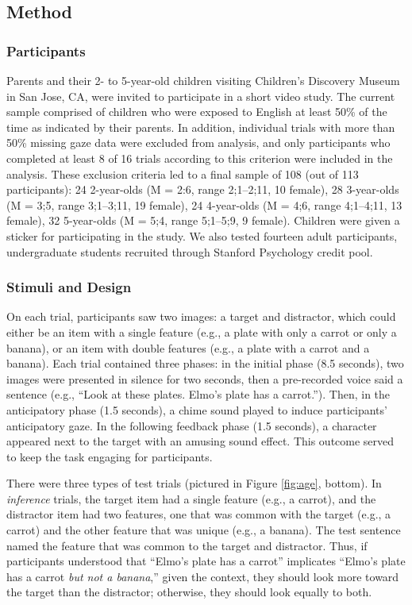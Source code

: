 \documentclass[10pt,letterpaper]{article}
\begin{document}
\subsection{Method}

\subsubsection{Participants}

Parents and their 2- to 5-year-old children visiting Children's Discovery Museum in San Jose, CA, were invited to participate in a short video study. The current sample comprised of children who were exposed to English at least 50\% of the time as indicated by their parents. In addition, individual trials with more than 50\% missing gaze data were excluded from analysis, and only participants who completed at least 8 of 16 trials according to this criterion were included in the analysis. These exclusion criteria led to a final sample of 108 (out of 113 participants): 24 2-year-olds (M = 2:6, range 2;1--2;11, 10 female), 28 3-year-olds (M = 3;5, range 3;1--3;11, 19 female), 24 4-year-olds (M = 4;6, range 4;1--4;11, 13 female), 32 5-year-olds (M = 5;4, range 5;1--5;9, 9 female). Children were given a sticker for participating in the study. We also tested fourteen adult participants, undergraduate students recruited through Stanford Psychology credit pool.

\subsubsection{Stimuli and Design}

On each trial, participants saw two images: a target and distractor, which could either be an item with a single feature (e.g., a plate with only a carrot or only a banana), or an item with double features (e.g., a plate with a carrot and a banana). Each trial contained three phases: in the initial phase (8.5 seconds), two images were presented in silence for two seconds, then a pre-recorded voice said a sentence (e.g., ``Look at these plates. Elmo's plate has a carrot.''). Then, in the anticipatory phase (1.5 seconds), a chime sound played to induce participants' anticipatory gaze. In the following feedback phase (1.5 seconds), a character appeared next to the target with an amusing sound effect. This outcome served to keep the task engaging for participants.

There were three types of test trials (pictured in Figure \ref{fig:age}, bottom). In \emph{inference} trials, the target item had a single feature (e.g., a carrot), and the distractor item had two features, one that was common with the target (e.g., a carrot) and the other feature that was unique (e.g., a banana). The test sentence named the feature that was common to the target and distractor. Thus, if participants understood that ``Elmo's plate has a carrot'' implicates ``Elmo's plate has a carrot \emph{but not a banana},'' given the context, they should look more toward the target than the distractor; otherwise, they should look equally to both.
\end{document}

